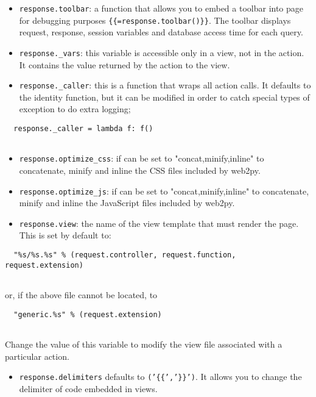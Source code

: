 \documentclass[justified,sixbynine,notoc]{tufte-book}
\def\ft{\small\tt}
\begin{document}
\begin{fullwidth}
\begin{itemize}
\item {\ft response.toolbar}: a function that allows you to embed a toolbar into page for debugging purposes {\ft \{\{=response.toolbar()\}\}}. The toolbar displays request, response, session variables and database access time for each query.

\item {\ft response.\_vars}: this variable is accessible only in a view, not in the action. It contains the value returned by the action to the view.

\item {\ft response.\_caller}: this is a function that wraps all action calls. It defaults to the identity function, but it can be modified in order to catch special types of exception to do extra logging;
\end{itemize}
\begin{lstlisting}
  response._caller = lambda f: f()
  
\end{lstlisting}
\begin{itemize}
\item {\ft response.optimize\_css}: if can be set to "concat,minify,inline" to concatenate, minify and inline the CSS files included by web2py.

\item {\ft response.optimize\_js}: if can be set to "concat,minify,inline" to concatenate, minify and inline the JavaScript files included by web2py.

\item {\ft response.view}: the name of the view template that must render the page. This is set by default to:
\end{itemize}
\begin{lstlisting}
  "%s/%s.%s" % (request.controller, request.function, request.extension)
  
\end{lstlisting}
or, if the above file cannot be located, to
\begin{lstlisting}
  "generic.%s" % (request.extension)
  
\end{lstlisting}
Change the value of this variable to modify the view file associated with a particular action.

\begin{itemize}
\item {\ft response.delimiters} defaults to {\ft ('\{\{','\}\}')}. It allows you to change the delimiter of code embedded in views.


\end{itemize}
\end{fullwidth}
\end{document}

